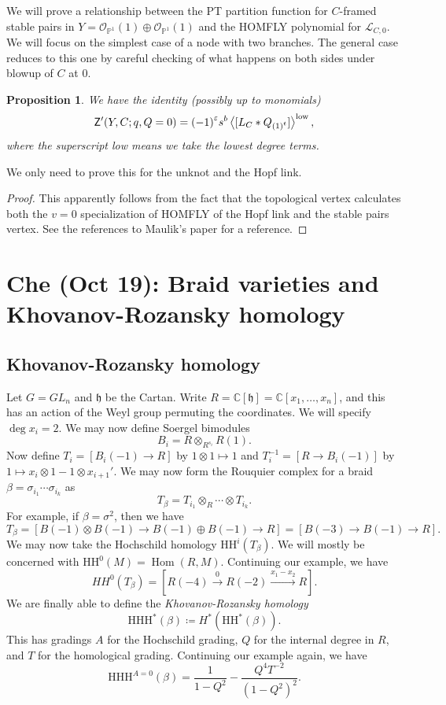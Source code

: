 \documentclass[leqno, openany]{memoir}
\newtheorem{prop}[thm]{Proposition}
\theoremstyle{definition}
\theoremstyle{remark}
\theoremstyle{plain}
\theoremstyle{definition}
\theoremstyle{remark}
\newcommand{\C}{\mathbb{C}}
\renewcommand{\P}{\mathbb{P}}
\newcommand{\h}{\mathfrak{h}}
\newcommand{\ep}{\varepsilon}
\newcommand{\mc}[1]{\mathcal{#1}}
\newcommand{\mr}[1]{\mathrm{#1}}
\newcommand{\ms}[1]{\mathsf{#1}}
\newcommand{\1}{\mathbf{1}}
\newcommand{\2}{\mathbf{2}}
\newcommand{\3}{\mathbf{3}}
\DeclareMathOperator{\Hom}{Hom}
\begin{document}
We will prove a relationship between the PT partition function for $C$-framed stable pairs in $Y = \mc{O}_{\P^1}(1) \oplus \mc{O}_{\P^1}(1)$ and the HOMFLY polynomial for $\mc{L}_{C,0}$. We will focus on the simplest case of a node with two branches. The general case reduces to this one by careful checking of what happens on both sides under blowup of $C$ at $0$.

\begin{prop}
    We have the identity (possibly up to monomials)
    \[ \ms{Z}'(Y, C; q, Q=0) = {(-1)}^{\ep} s^b \ev{[L_C * Q_{{(1)}^t}]}^{\mr{low}}, \]
    where the superscript low means we take the lowest degree terms.
\end{prop}

We only need to prove this for the unknot and the Hopf link.

\begin{proof}
    This apparently follows from the fact that the topological vertex calculates both the $v=0$ specialization of HOMFLY of the Hopf link and the stable pairs vertex. See the references to Maulik's paper for a reference.
\end{proof}

\chapter{Che (Oct 19): Braid varieties and Khovanov-Rozansky homology}%
\label{cha:che_oct_19_braid_varieties_and_khovanov_rozansky_homology}

\section{Khovanov-Rozansky homology}%
\label{sec:khovanov_rozansky_homology}

Let $G = GL_n$ and $\h$ be the Cartan. Write $R = \C[\h] = \C[x_1, \ldots, x_n]$, and this has an action of the Weyl group permuting the coordinates. We will specify $\deg x_i = 2$. We may now define Soergel bimodules
\[ B_i = R \otimes_{R^{s_i}} R(1). \]
Now define $T_i = [B_i(-1) \to R]$ by $1 \otimes 1 \mapsto 1$ and $T_i^{-1} = [R \to B_i(-1)]$ by $1 \mapsto x_i \otimes 1 - 1 \otimes x_{i+1}'$. We may now form the Rouquier complex for a braid $\beta = \sigma_{i_1} \cdots \sigma_{i_k}$ as
\[ T_{\beta} = T_{i_1} \otimes_R \cdots \otimes T_{i_k}. \]
For example, if $\beta = \sigma^2$, then we have
\[ T_{\beta} = [B(-1) \otimes B(-1) \to B(-1) \oplus B(-1) \to R] = [B(-3) \to B(-1) \to R]. \]
We may now take the Hochschild homology $\mr{HH}^i(T_{\beta})$. We will mostly be concerned with $\mr{HH}^0(M) = \Hom(R, M)$. Continuing our example, we have
\[ HH^0(T_{\beta}) = [R(-4) \xrightarrow{0} R(-2) \xrightarrow{x_1 - x_2} R]. \]
We are finally able to define the \textit{Khovanov-Rozansky homology}
\[ \mr{HHH}^*(\beta) \coloneqq H^*(\mr{HH}^*(\beta)). \]
This has gradings $A$ for the Hochschild grading, $Q$ for the internal degree in $R$, and $T$ for the homological grading. Continuing our example again, we have
\[ \mr{HHH}^{A=0}(\beta) = \frac{1}{1-Q^2} - \frac{Q^4 T^{-2}}{{(1-Q^2)}^2}. \]
\end{document}
